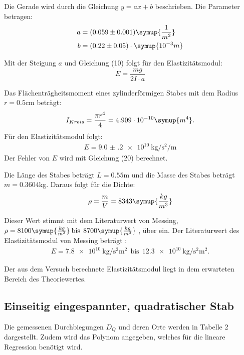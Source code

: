 Die Gerade wird durch die Gleichung $y = ax + b$ beschrieben. Die Parameter betragen:
\begin{align*}
  a &= (0.059 \pm 0.001) \symup{\frac{1}{m^2}}\\
  b &= (0.22  \pm 0.05) \cdot \symup{10^{-3}m}
\end{align*}

Mit der Steigung $a$ und Gleichung (10) folgt für den Elastizitätsmodul:
\begin{equation}
  E = \frac{mg}{2I \cdot a}
\end{equation}

Das Flächenträgheitsmoment eines zylinderförmigen Stabes mit dem Radius
$r = 0.5$cm beträgt:
\begin{equation}
  I_{Kreis} = \frac{\pi r^4}{4} = 4.909 \cdot 10^{-10} \symup{m^4} .
\end{equation}
Für den Elastizitätsmodul folgt:
\begin{align*}
  E = \SI{9.0(2)e10}{\kilo\gram\per\second\squared\per\meter}
\end{align*}
Der Fehler von $E$ wird mit Gleichung (20) berechnet.

Die Länge des Stabes beträgt $L = 0.55$m und die Masse des Stabes beträgt $m = 0.3604$kg.
Daraus folgt für die Dichte:
\begin{equation}
  \rho = \frac{m}{V} = 8343 \symup{\frac{kg}{m^3}}
\end{equation}

Dieser Wert stimmt mit dem Literaturwert von Messing, $\rho =8100\symup{\frac{kg}{m^3}}\: \text{bis}\:\: 8700\symup{\frac{kg}{m^3}}$ \cite{sample2},
über ein.
Der Literaturwert des Elastizitätsmodul von Messing beträgt \cite{sample2}:
\begin{align*}
  E = \SI{7.8e10}{\kilo\gram\per\second\squared\square\meter} \:\: \text{bis} \:\:
  \SI{12.3e10}{\kilo\gram\per\second\squared\square\meter}.
\end{align*}

Der aus dem Versuch berechnete Elastizitätsmodul liegt in dem erwarteten Bereich des Theoriewertes.

\subsection{Einseitig eingespannter, quadratischer Stab}
Die gemessenen Durchbiegungen $D_Q$ und deren Orte werden in Tabelle 2 dargestellt. Zudem wird
das Polynom angegeben, welches für die lineare Regression benötigt wird.

